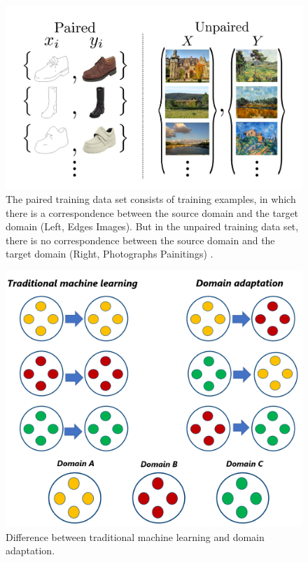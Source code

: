 \begin{figure}[H]
        \begin{center}
	    \includegraphics[scale=0.50]{images/Introduction/img_translation.JPG}
	    \caption[Examples of the paired training data set and the unpaired training data set.]{The paired training data set consists of training examples, in which there is a correspondence between the source domain and the target domain (Left, Edges \leftrightarrow Images). But in the unpaired training data set, there is no correspondence between the source domain and the target domain (Right, Photographs \leftrightarrow Painitings) \cite{zhu2020unpaired}.}
	    \label{fig:img_translation}
	    \end{center}
\end{figure}


\begin{figure}[H]
        \begin{center}
	 	    \includegraphics[scale=0.28]{images/Introduction/DomainAdaptation.png}
	    \caption[Difference between traditional machine learning and domain adaptation.]{Difference between traditional machine learning and domain adaptation.}
	    \label{fig:DomainAdaptation}
	    \end{center}
\end{figure}




